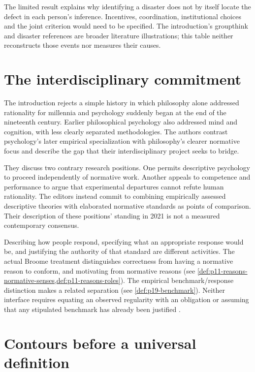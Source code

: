The limited result explains why identifying a disaster does not by
itself locate the defect in each person's inference. Incentives,
coordination, institutional choices and the joint criterion would need
to be specified. The introduction's groupthink and disaster references
are broader literature illustrations; this table neither reconstructs
those events nor measures their causes.

\section{The interdisciplinary commitment}

The introduction rejects a simple history in which philosophy alone
addressed rationality for millennia and psychology suddenly began at
the end of the nineteenth century. Earlier philosophical psychology
also addressed mind and cognition, with less clearly separated
methodologies. The authors contrast psychology's later empirical
specialization with philosophy's clearer normative focus and describe
the gap that their interdisciplinary project seeks to bridge.

They discuss two contrary research positions. One permits descriptive
psychology to proceed independently of normative work. Another appeals
to competence and performance to argue that experimental departures
cannot refute human rationality. The editors instead commit to combining
empirically assessed descriptive theories with elaborated normative
standards as points of comparison. Their description of these positions'
standing in 2021 is not a measured contemporary consensus.

Describing how people respond, specifying what an appropriate response
would be, and justifying the authority of that standard are different
activities. The actual Broome treatment distinguishes correctness from
having a normative reason to conform, and motivating from normative
reasons (see \cref{def:p11-reasons-normative-senses,def:p11-reasons-roles}).
The empirical benchmark/response distinction makes a related separation
(see \cref{def:p19-benchmark}). Neither interface requires equating
an observed regularity with an obligation or assuming that any stipulated
benchmark has already been justified
\cite[p.~2 and note~1]{KnauffSpohn2021FrameworksIntro}.

\section{Contours before a universal definition}

